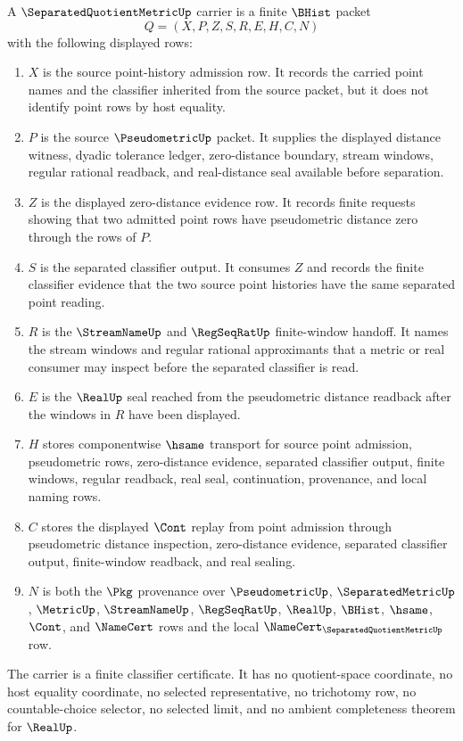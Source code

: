 \begin{definition}
\label{def:separated-quotient-metric-carrier}
A $\SeparatedQuotientMetricUp$ carrier is a finite $\BHist$ packet
$$
Q=(X,P,Z,S,R,E,H,C,N)
$$
with the following displayed rows:
\begin{enumerate}
\item $X$ is the source point-history admission row. It records the carried point names and the classifier inherited from the source packet, but it does not identify point rows by host equality.
\item $P$ is the source $\PseudometricUp$ packet. It supplies the displayed distance witness, dyadic tolerance ledger, zero-distance boundary, stream windows, regular rational readback, and real-distance seal available before separation.
\item $Z$ is the displayed zero-distance evidence row. It records finite requests showing that two admitted point rows have pseudometric distance zero through the rows of $P$.
\item $S$ is the separated classifier output. It consumes $Z$ and records the finite classifier evidence that the two source point histories have the same separated point reading.
\item $R$ is the $\StreamNameUp$ and $\RegSeqRatUp$ finite-window handoff. It names the stream windows and regular rational approximants that a metric or real consumer may inspect before the separated classifier is read.
\item $E$ is the $\RealUp$ seal reached from the pseudometric distance readback after the windows in $R$ have been displayed.
\item $H$ stores componentwise $\hsame$ transport for source point admission, pseudometric rows, zero-distance evidence, separated classifier output, finite windows, regular readback, real seal, continuation, provenance, and local naming rows.
\item $C$ stores the displayed $\Cont$ replay from point admission through pseudometric distance inspection, zero-distance evidence, separated classifier output, finite-window readback, and real sealing.
\item $N$ is both the $\Pkg$ provenance over $\PseudometricUp$, $\SeparatedMetricUp$, $\MetricUp$, $\StreamNameUp$, $\RegSeqRatUp$, $\RealUp$, $\BHist$, $\hsame$, $\Cont$, and $\NameCert$ rows and the local $\NameCert_{\SeparatedQuotientMetricUp}$ row.
\end{enumerate}
The carrier is a finite classifier certificate. It has no quotient-space coordinate, no host equality coordinate, no selected representative, no trichotomy row, no countable-choice selector, no selected limit, and no ambient completeness theorem for $\RealUp$.
\end{definition}

